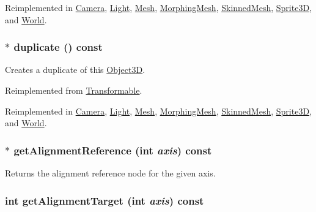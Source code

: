 Reimplemented in \hyperlink{classm3g_1_1Camera_8aad1ceab4c2a03609c8a42324ce484d}{Camera}, \hyperlink{classm3g_1_1Light_8aad1ceab4c2a03609c8a42324ce484d}{Light}, \hyperlink{classm3g_1_1Mesh_8aad1ceab4c2a03609c8a42324ce484d}{Mesh}, \hyperlink{classm3g_1_1MorphingMesh_8aad1ceab4c2a03609c8a42324ce484d}{MorphingMesh}, \hyperlink{classm3g_1_1SkinnedMesh_8aad1ceab4c2a03609c8a42324ce484d}{SkinnedMesh}, \hyperlink{classm3g_1_1Sprite3D_8aad1ceab4c2a03609c8a42324ce484d}{Sprite3D}, and \hyperlink{classm3g_1_1World_8aad1ceab4c2a03609c8a42324ce484d}{World}.\hypertarget{classm3g_1_1Node_0b9f7531a4b56d34f47aeb1fff0d37e0}{
\subsubsection[{duplicate}]{ $\ast$ duplicate () const}}
\label{classm3g_1_1Node_0b9f7531a4b56d34f47aeb1fff0d37e0}


Creates a duplicate of this \hyperlink{classm3g_1_1Object3D}{Object3D}. 

Reimplemented from \hyperlink{classm3g_1_1Transformable_4f64f95a34c56cb1553dc6de660dff6f}{Transformable}.

Reimplemented in \hyperlink{classm3g_1_1Camera_6279f7f8ab52af683fadd193d7694f2d}{Camera}, \hyperlink{classm3g_1_1Light_7a41af040d0c1566358d84f089cd0cd1}{Light}, \hyperlink{classm3g_1_1Mesh_52ce6d0b3eda2bd3a95bfb5b7dbb6f82}{Mesh}, \hyperlink{classm3g_1_1MorphingMesh_7e7b2c3c4c988c6341a5e249bd468f57}{MorphingMesh}, \hyperlink{classm3g_1_1SkinnedMesh_d3f422cf7656b73687d789094c7eae42}{SkinnedMesh}, \hyperlink{classm3g_1_1Sprite3D_0af34e87be803eb476f9e118d2363246}{Sprite3D}, and \hyperlink{classm3g_1_1World_efde97aaf753d48fff769d9011f187f2}{World}.\hypertarget{classm3g_1_1Node_ca338390bd2dee287fe6f5cbc4e094e1}{
\subsubsection[{getAlignmentReference}]{ $\ast$ getAlignmentReference (int {\em axis}) const}}
\label{classm3g_1_1Node_ca338390bd2dee287fe6f5cbc4e094e1}


Returns the alignment reference node for the given axis. \hypertarget{classm3g_1_1Node_e5bbf42b3d88193fda0b476e1b1da009}{
\subsubsection[{getAlignmentTarget}]{\setlength{\rightskip}{0pt plus 5cm}int getAlignmentTarget (int {\em axis}) const}}
\label{classm3g_1_1Node_e5bbf42b3d88193fda0b476e1b1da009}


